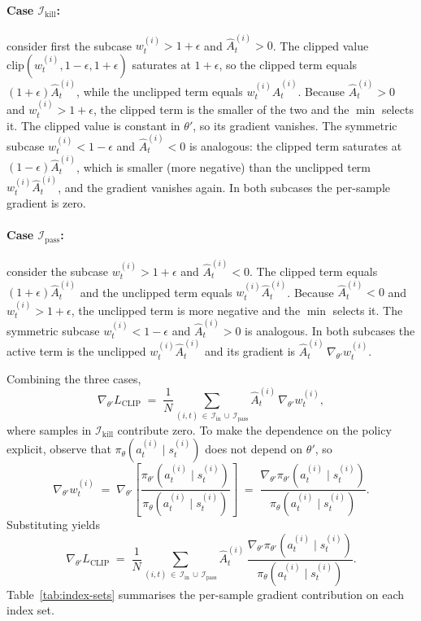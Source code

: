 \documentclass{article}
\begin{document}
\paragraph{Case $\mathcal{I}_{\mathrm{kill}}$:} consider first the
subcase $w_t^{(i)} > 1+\epsilon$ and $\hat{A}_t^{(i)} > 0$. The
clipped value $\mathrm{clip}(w_t^{(i)}, 1-\epsilon, 1+\epsilon)$
saturates at $1+\epsilon$, so the clipped term equals $(1+\epsilon)
\hat{A}_t^{(i)}$, while the unclipped term equals
$w_t^{(i)}\hat{A}_t^{(i)}$. Because $\hat{A}_t^{(i)} > 0$ and
$w_t^{(i)} > 1+\epsilon$, the clipped term is the smaller of the two
and the $\min$ selects it. The clipped value is constant in
$\theta'$, so its gradient vanishes. The symmetric subcase
$w_t^{(i)} < 1-\epsilon$ and $\hat{A}_t^{(i)} < 0$ is analogous: the
clipped term saturates at $(1-\epsilon)\hat{A}_t^{(i)}$, which is
smaller (more negative) than the unclipped term $w_t^{(i)}
\hat{A}_t^{(i)}$, and the gradient vanishes again. In both
subcases the per-sample gradient is zero.

\paragraph{Case $\mathcal{I}_{\mathrm{pass}}$:} consider the
subcase $w_t^{(i)} > 1+\epsilon$ and $\hat{A}_t^{(i)} < 0$. The
clipped term equals $(1+\epsilon)\hat{A}_t^{(i)}$ and the unclipped
term equals $w_t^{(i)}\hat{A}_t^{(i)}$. Because $\hat{A}_t^{(i)} <
0$ and $w_t^{(i)} > 1+\epsilon$, the unclipped term is more negative
and the $\min$ selects it. The symmetric subcase $w_t^{(i)} <
1-\epsilon$ and $\hat{A}_t^{(i)} > 0$ is analogous. In both
subcases the active term is the unclipped $w_t^{(i)}\hat{A}_t^{(i)}$
and its gradient is $\hat{A}_t^{(i)}\,\nabla_{\theta'} w_t^{(i)}$.

Combining the three cases,
\[
\nabla_{\theta'} L_{\mathrm{CLIP}}
\;=\;
\frac{1}{N} \sum_{(i,t)\,\in\,\mathcal{I}_{\mathrm{in}}\,\cup\,\mathcal{I}_{\mathrm{pass}}}
\hat{A}_t^{(i)}\, \nabla_{\theta'} w_t^{(i)},
\]
where samples in $\mathcal{I}_{\mathrm{kill}}$ contribute zero. To
make the dependence on the policy explicit, observe that
$\pi_{\theta}(a_t^{(i)} \mid s_t^{(i)})$ does not depend on
$\theta'$, so
\[
\nabla_{\theta'} w_t^{(i)}
\;=\;
\nabla_{\theta'} \!
\left[
\frac{\pi_{\theta'}(a_t^{(i)} \mid s_t^{(i)})}
     {\pi_{\theta}(a_t^{(i)} \mid s_t^{(i)})}
\right]
\;=\;
\frac{\nabla_{\theta'} \pi_{\theta'}\!\left(a_t^{(i)} \mid s_t^{(i)}\right)}
     {\pi_{\theta}\!\left(a_t^{(i)} \mid s_t^{(i)}\right)}.
\]
Substituting yields
\begin{equation}
\nabla_{\theta'} L_{\mathrm{CLIP}}
\;=\;
\frac{1}{N} \sum_{(i,t)\,\in\,\mathcal{I}_{\mathrm{in}}\,\cup\,\mathcal{I}_{\mathrm{pass}}}
\hat{A}_t^{(i)} \,
\frac{\nabla_{\theta'} \pi_{\theta'}\!\left(a_t^{(i)} \mid s_t^{(i)}\right)}
     {\pi_\theta\!\left(a_t^{(i)} \mid s_t^{(i)}\right)}.
\label{eq:clip-grad}
\end{equation}
Table~\ref{tab:index-sets} summarises the per-sample gradient
contribution on each index set.
\end{document}
